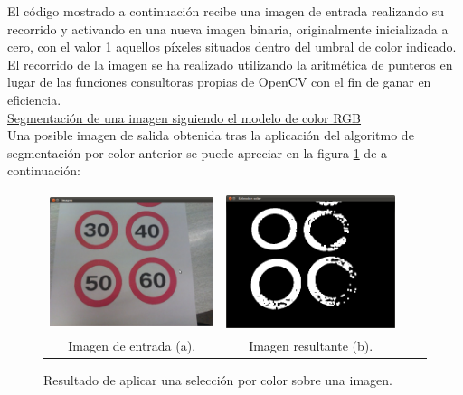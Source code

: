 El código mostrado a continuación recibe una imagen de entrada realizando su recorrido y activando en una nueva imagen binaria, originalmente inicializada a cero, con el valor 1 aquellos píxeles situados dentro del umbral de color indicado. El recorrido de la imagen se ha realizado utilizando la aritmética de punteros en lugar de las funciones consultoras propias de OpenCV con el fin de ganar en eficiencia.\\

\underline{Segmentación de una imagen siguiendo el modelo de color RGB}\\


Una posible imagen de salida obtenida tras la aplicación del algoritmo de segmentación por color anterior se puede apreciar en la figura \ref{fig:ejemplo-selec-color} de a continuación:\\
 
\begin{figure}[H]
  \begin{center}
      \begin{tabular}{cc p{7cm}p{7cm}}
        \includegraphics[width=7cm]{./imagenes/im-entrada.png} & \includegraphics[width=7cm]{./imagenes/paso0.png}\\
        {Imagen de entrada (a).} & {Imagen resultante (b).}\\
      \end{tabular}
    \caption{Resultado de aplicar una selección por color sobre una imagen.}
    \label{fig:ejemplo-selec-color}
  \end{center}
\end{figure}

